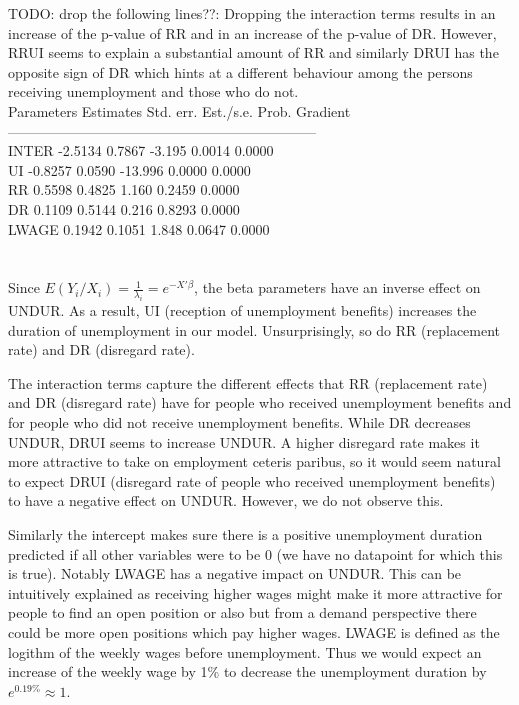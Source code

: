 \documentclass[11pt]{article}
\theoremstyle{break}
\begin{document}
TODO: drop the following lines??: Dropping the interaction terms results in an increase of the p-value of RR and in an increase of the p-value of DR. However, RRUI seems to explain a substantial amount of RR and similarly DRUI has the opposite sign of DR which hints at a different behaviour among the persons receiving unemployment and those who do not.  \\
Parameters    Estimates     Std. err.  Est./s.e.  Prob.    Gradient \\
------------------------------------------------------------------ \\
INTER           -2.5134        0.7867   -3.195   0.0014      0.0000 \\
UI              -0.8257        0.0590  -13.996   0.0000      0.0000 \\
RR               0.5598        0.4825    1.160   0.2459      0.0000 \\
DR               0.1109        0.5144    0.216   0.8293      0.0000 \\
LWAGE            0.1942        0.1051    1.848   0.0647      0.0000 \\
\\
\\

Since $E(Y_i/X_i) = \frac{1}{\lambda_i} = e^{-X'\beta}$, the beta parameters have an inverse effect on UNDUR. As a result, UI (reception of unemployment benefits) increases the duration of unemployment in our model. Unsurprisingly, so do RR (replacement rate) and DR (disregard rate).

The interaction terms capture the different effects that RR (replacement rate) and DR (disregard rate) have for people who received unemployment benefits and for people who did not receive unemployment benefits. While DR decreases UNDUR, DRUI seems to increase UNDUR. A higher disregard rate makes it more attractive to take on employment ceteris paribus, so it would seem natural to expect DRUI (disregard rate of people who received unemployment benefits) to have a negative effect on UNDUR. However, we do not observe this.

Similarly the intercept makes sure there is a positive unemployment duration predicted if all other variables were to be 0 (we have no datapoint for which this is true). Notably LWAGE has a negative impact on UNDUR. This can be intuitively explained as receiving higher wages might make it more attractive for people to find an open position or also but from a demand perspective there could be more open positions which pay higher wages. LWAGE is defined as the logithm of the weekly wages before unemployment. Thus we would expect an increase of the weekly wage by 1\% to decrease the unemployment duration by $e^{0.19\%} \approx 1$.
\end{document}
